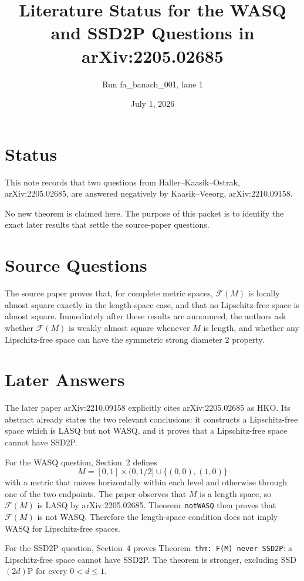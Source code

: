 \documentclass[11pt]{article}
\title{Literature Status for the WASQ and SSD2P Questions in arXiv:2205.02685}
\author{Run fa\_banach\_001, lane 1}
\date{July 1, 2026}
\newcommand{\F}{\mathcal F}
\begin{document}
\maketitle

\section*{Status}

This note records that two questions from Haller--Kaasik--Ostrak,
arXiv:2205.02685, are answered negatively by Kaasik--Veeorg,
arXiv:2210.09158.

No new theorem is claimed here. The purpose of this packet is to identify the
exact later results that settle the source-paper questions.

\section*{Source Questions}

The source paper proves that, for complete metric spaces, $\F(M)$ is locally
almost square exactly in the length-space case, and that no Lipschitz-free
space is almost square. Immediately after these results are announced, the
authors ask whether $\F(M)$ is weakly almost square whenever $M$ is length, and
whether any Lipschitz-free space can have the symmetric strong diameter
$2$ property.

\section*{Later Answers}

The later paper arXiv:2210.09158 explicitly cites arXiv:2205.02685 as HKO.
Its abstract already states the two relevant conclusions: it constructs a
Lipschitz-free space which is LASQ but not WASQ, and it proves that a
Lipschitz-free space cannot have SSD2P.

For the WASQ question, Section~2 defines
\[
M=[0,1]\times(0,1/2]\cup\{(0,0),(1,0)\}
\]
with a metric that moves horizontally within each level and otherwise through
one of the two endpoints. The paper observes that $M$ is a length space, so
$\F(M)$ is LASQ by arXiv:2205.02685. Theorem~\texttt{notWASQ} then proves
that $\F(M)$ is not WASQ. Therefore the length-space condition does not imply
WASQ for Lipschitz-free spaces.

For the SSD2P question, Section~4 proves Theorem~\texttt{thm: F(M) never
SSD2P}: a Lipschitz-free space cannot have SSD2P. The theorem is stronger,
excluding SSD$(2d)$P for every $0<d\leq 1$.
\end{document}
